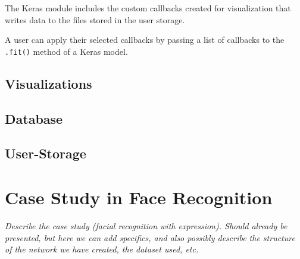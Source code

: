 The Keras module includes the custom callbacks created for visualization that writes data to the files stored in the user storage.


A user can apply their selected callbacks by passing a list of callbacks to the \texttt{.fit()} method of a Keras model.

\subsection{Visualizations}

\subsection{Database}

\subsection{User-Storage}

\section{Case Study in Face Recognition}

\textit{Describe the case study (facial recognition with expression).
Should already be presented, but here we can add specifics, and also possibly describe the structure of the network we have created, the dataset used, etc.}


\cleardoublepage